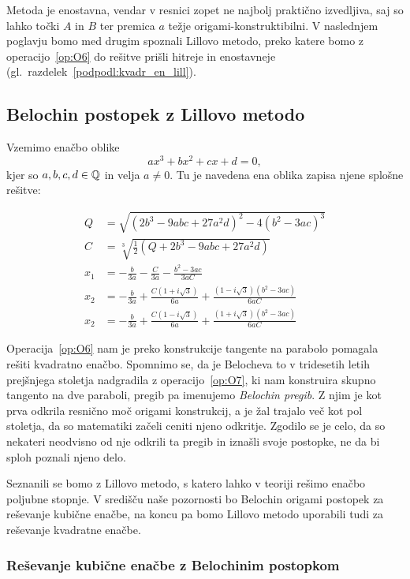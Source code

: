 Metoda je enostavna, vendar v resnici zopet ne najbolj praktično izvedljiva, saj so lahko točki $A$ in $B$ ter premica $a$ težje origami-konstruktibilni. V naslednjem poglavju bomo med drugim spoznali Lillovo metodo, preko katere bomo z operacijo~\ref{op:O6} do rešitve prišli hitreje in enostavneje (gl.\ razdelek~\ref{podpodl:kvadr_en_lill}).

\subsection{Belochin postopek z Lillovo metodo}
\label{podpogl:kubicna_enacba}

Vzemimo enačbo oblike
$$ a x^3 + b x^2 + c x + d = 0, $$
kjer so $a, b, c, d \in \mathbb Q$ in velja $a \neq 0$. Tu je navedena ena oblika zapisa njene splošne rešitve:

\begin{align*}
    Q &= \sqrt{(2b^3 - 9abc + 27a^2d)^2 - 4(b^2 - 3ac)^3} \\
    C &= \sqrt[3]{\frac{1}{2}(Q + 2b^3 - 9abc + 27a^2d)} \\
    x_1 &= - \frac{b}{3a} - \frac{C}{3a} - \frac{b^2 - 3ac}{3aC} \\
    x_2 &= - \frac{b}{3a} + \frac{C(1 + i\sqrt{3})}{6a} + \frac{(1 - i\sqrt{3})(b^2 - 3ac)}{6aC} \\
    x_2 &= - \frac{b}{3a} + \frac{C(1 - i\sqrt{3})}{6a} + \frac{(1 + i\sqrt{3})(b^2 - 3ac)}{6aC}
\end{align*}

Operacija~\ref{op:O6} nam je preko konstrukcije tangente na parabolo pomagala rešiti kvadratno enačbo. Spomnimo se, da je Belocheva to v tridesetih letih prejšnjega stoletja nadgradila z operacijo~\ref{op:O7}, ki nam konstruira skupno tangento na dve paraboli, pregib pa imenujemo \emph{Belochin pregib}. Z njim je kot prva odkrila resnično moč origami konstrukcij, a je žal trajalo več kot pol stoletja, da so matematiki začeli ceniti njeno odkritje. Zgodilo se je celo, da so nekateri neodvisno od nje odkrili ta pregib in iznašli svoje postopke, ne da bi sploh poznali njeno delo.

Seznanili se bomo z Lillovo metodo, s katero lahko v teoriji rešimo enačbo poljubne stopnje. V središču naše pozornosti bo Belochin origami postopek za reševanje kubične enačbe, na koncu pa bomo Lillovo metodo uporabili tudi za reševanje kvadratne enačbe.

\subsubsection{Reševanje kubične enačbe z Belochinim postopkom}


